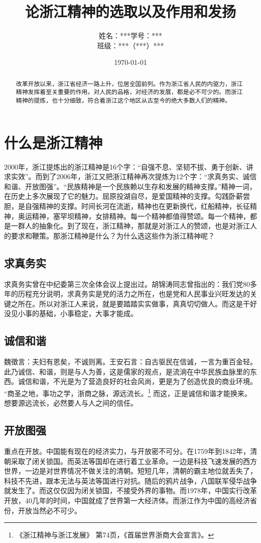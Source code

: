 \documentclass{article}
\begin{document}
  \title{论浙江精神的选取以及作用和发扬}
  \author{姓名：***\quad 学号：***\\班级：***（***）***}
  \date{\today}
  \maketitle
  \begin{abstract}
    改革开放以来，浙江省经济一路上升，位居全国前列。作为浙江省人民的内驱力，浙江精神发挥着至关重要的作用。对人民的品格，对经济的发展，都是必不可少的。而浙江精神的提炼，也十分细致，符合着浙江这个地区从古至今的绝大多数人们的精神。
  \end{abstract}
  \section{什么是浙江精神}
  2000年，浙江提炼出的浙江精神是16个字：“自强不息、坚韧不拔、勇于创新、讲求实效”。而到了2006年，浙江又把浙江精神再次提炼为12个字：“求真务实、诚信和谐、开放图强”。“民族精神是一个民族赖以生存和发展的精神支撑。”精神一词，在历史上多次展现了它的魅力。屈原投湖自尽，是爱国精神的支撑。勾践卧薪尝胆，是自强精神的支撑。时间长河在流逝，精神也在更新换代，红船精神，长征精神，奥运精神，塞罕坝精神，女排精神。每一个精神都值得赞颂。每一个精神，都是一群人的抽象化。到了现在，浙江精神，那就是对浙江人的赞颂，也是对浙江人的要求和鞭策。那浙江精神是什么？为什么选这些作为浙江精神呢？

  \subsection{求真务实}
  求真务实曾在中纪委第三次全体会议上提出过。胡锦涛同志曾指出的：我们党80多年的历程充分说明，求真务实是党的活力之所在，也是党和人民事业兴旺发达的关键之所在。所以对浙江人来说，就是要踏踏实实做事，真真切切做人。而这是干好没见小事的基础，小事稳定，大事才能成。

  \subsection{诚信和谐}
  魏徵言：夫妇有恩矣，不诚则离。王安石言：自古驱民在信诚，一言为重百金轻。此乃诚信、和谐，则是与人为善，这是儒家的观点，是流淌在中华民族血脉里的东西。诚信和谐，不光是为了营造良好的社会风尚，更是为了创造优良的商业环境。 “商圣之地，事功之学，浙商之脉，源远流长。\footnote{《浙江精神与浙江发展》 第74页，《首届世界浙商大会宣言》。} 而这，正是诚信和谐才能换来。想要源远流长，必然要人与人之间的信任。

  \subsection{开放图强}
  重点在开放。中国能有现在的经济实力，与开放密不可分。在1759年到1842年，清朝采取了闭关锁国。而英法等国却在进行着工业革命。一边是科技飞速发展的西方世界，一边是对世界情况不做关注的清朝。短短几年，清朝的霸主地位就丢失了，科技不先进，跟本无法与英法等国进行对抗。随后的鸦片战争，八国联军侵华战争就发生了。而这仅仅因为闭关锁国，不接受外界的事物。而1978年，中国实行改革开放，40几年的时间，中国就成了世界第一大经济体。而浙江作为中国的高经济省份，开放当然必不可少。
\end{document}
